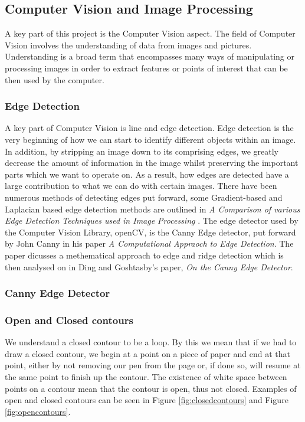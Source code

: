 \documentclass[11pt]{report}
\begin{document}
\subsection*{Computer Vision and Image Processing}
A key part of this project is the Computer Vision aspect. The field of
Computer Vision involves the understanding of data from images and pictures.
Understanding is a broad term that encompasses many ways of manipulating or
processing images in order to extract features or points of interest that
can be then used by the computer.

\subsubsection*{Edge Detection}
A key part of Computer Vision is line and edge detection. Edge detection is
the very beginning of how we can start to identify different objects 
within an image. In addition, by stripping an image down to its comprising
edges, we greatly decrease the amount of information in the image whilst
preserving the important parts which we want to operate on.
As a result, how edges are detected have a large contribution
to what we can do with certain images. There have been 
numerous methods of detecting edges put forward, some Gradient-based and
Laplacian based edge detection methods are outlined in 
\textit{A Comparison of various Edge Detection Techniques used in Image Processing}
\cite{Shriv12}. The edge detector used by the Computer Vision Library, 
openCV, is the Canny Edge detector, put forward by John Canny in his paper
\textit{A Computational Appraoch to Edge Detection}\cite{Canny86}. The paper
dicusses a methematical approach to edge and ridge detection which is then
analysed on in Ding and Goshtasby's paper, 
\textit{On the Canny Edge Detector}\cite{Ding00}.





\subsubsection*{Canny Edge Detector}



\subsubsection*{Open and Closed contours}
We understand a closed contour to be a loop. By this we mean that if we had
to draw a closed contour, we begin at a point on a piece of paper and end at that
point, either by not removing our pen from the page or, if done so, will resume
at the same point to finish up the contour. The existence of white space between
points on a contour mean that the contour is open, thus not closed. Examples
of open and closed contours can be seen in Figure \ref{fig:closedcontours} and 
Figure \ref{fig:opencontours}.
\\
\end{document}
